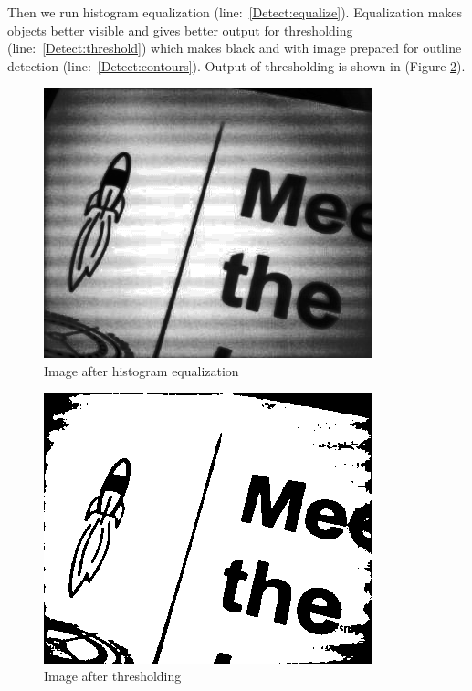 \documentclass{ifacconf}
\begin{document}
Then we run histogram equalization (line:~\ref{Detect:equalize}). Equalization
makes objects better visible and gives better output for thresholding
(line:~\ref{Detect:threshold}) which makes black and with image prepared for outline detection (line:~\ref{Detect:contours}). Output
of thresholding is shown in (Figure \ref{fig:threshold}).

\begin{figure}[h]
\includegraphics[width=\columnwidth]{images/3test-equalize-histogram.png}
\caption{Image after histogram equalization}
\label{fig:histogram}
\end{figure}

\begin{figure}[h]
\includegraphics[width=\columnwidth]{images/4test-threshold.png}
\caption{Image after thresholding}
\label{fig:threshold}
\end{figure}
\end{document}
